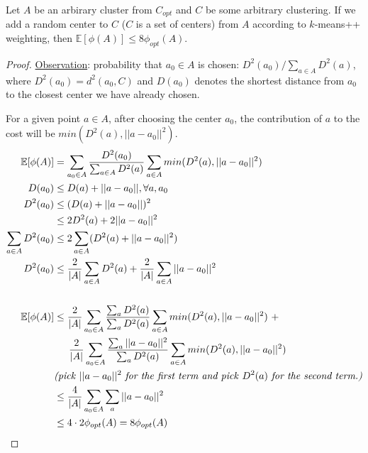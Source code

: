 \begin{lemma}
  Let $A$ be an arbirary cluster from $C_{opt}$ and $C$ be some
  arbitrary clustering. If we add a random center to $C$ ($C$ is a set
  of centers) from $A$ according to $k$-means++ weighting, then
  $\mathbb{E}[\phi(A)]\leq 8\phi_{opt}(A)$. 
\end{lemma}
\begin{proof}
  \underline{Observation}: probability that $a_0\in A$ is chosen:
  $D^2(a_0)/\sum_{a\in A}D^2(a)$, where $D^2(a_0)= d^2(a_0,C)$ and
  $D(a_0)$ denotes the shortest distance from $a_0$ to the closest
  center we have already chosen.
  
  For a given point $a\in A$, after choosing the center $a_0$, the
  contribution of $a$ to the cost will be $min(D^2(a),
  ||a-a_0||^2)$.\\ 
  \begin{align*}
    \mathbb{E}[\phi(A)] &= \sum_{a_0\in A}\frac{D^2(a_0)}{\sum_{a\in
        A}D^2(a)}\sum_{a\in A} min(D^2(a), ||a-a_0||^2)    \\
    D(a_0)&\leq D(a)+||a-a_0||, \forall a,a_0\\
    D^2(a_0)&\leq (D(a)+||a-a_0||)^2\\
    &\leq 2D^2(a)+2||a-a_0||^2\\
    \sum_{a\in A}D^2(a_0)&\leq 2\sum_{a\in A}(D^2(a)+||a-a_0||^2)\\ 
    D^2(a_0)&\leq \frac{2}{|A|}\sum_{a\in
      A}D^2(a)+\frac{2}{|A|}\sum_{a\in A}||a-a_0||^2\\\\ 
    \mathbb{E}[\phi(A)] &\leq \frac{2}{|A|}\sum_{a_0\in
      A}\frac{\sum_{a}D^2(a)}{\sum_{a}D^2(a)}\sum_{a\in A} min(D^2(a),
    ||a-a_0||^2)\ + \\ 
    &\hspace{1.5em} \frac{2}{|A|}\sum_{a_0\in
      A}\frac{\sum_{a}||a-a_0||^2}{\sum_{a}D^2(a)}\sum_{a\in A}
    min(D^2(a), ||a-a_0||^2)\\ 
    &\text{\textit{(pick}}\ ||a-a_0||^2\ \text{\textit{for the first
        term and pick}}\ D^2(a)\ \text{\textit{for the second
        term.)}}\\ 
    &\leq \frac{4}{|A|}\sum_{a_0\in A}\sum_{a}||a-a_0||^2\\
    &\leq 4\cdot 2\phi_{opt}(A)=8\phi_{opt}(A)
  \end{align*}	
\end{proof}
